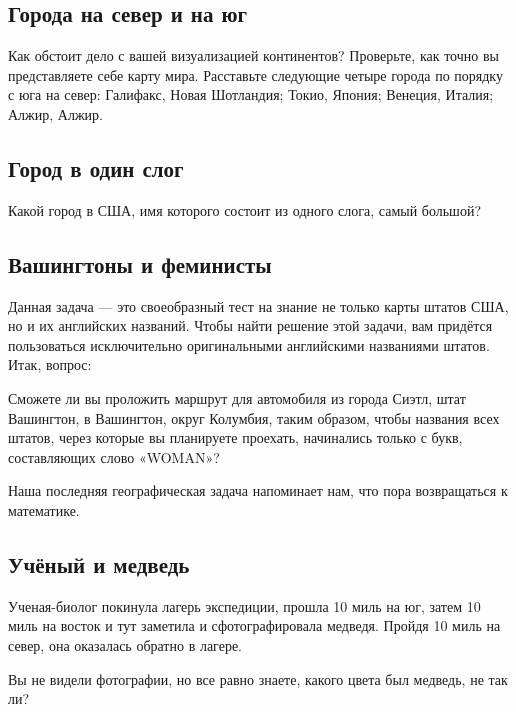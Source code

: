 \subsection*{Города на север и на юг}%


Как обстоит дело с вашей визуализацией континентов?
Проверьте, как точно вы представляете себе %
карту мира.
Расставьте следующие  четыре города по порядку с юга на север: 
Галифакс, Новая Шотландия; %
Токио, Япония; %
Венеция, Италия; %
Алжир, Алжир. %


\subsection*{Город в один слог}%


Какой город в США, имя которого состоит из одного слога,  самый большой?


\subsection*{Вашингтоны и феминисты}%


Данная задача --- это своеобразный тест на знание не только карты штатов США, но и их английских названий.  
Чтобы найти решение этой задачи, вам придётся пользоваться исключительно оригинальными английскими названиями штатов.  
Итак, вопрос:


Сможете ли вы проложить маршрут для автомобиля из города Сиэтл, штат Вашингтон, 
 в Вашингтон, округ Колумбия, таким образом, чтобы названия всех штатов, через которые вы планируете проехать, начинались только с букв, составляющих слово  «WOMAN»?


\medskip

Наша последняя географическая задача  напоминает нам, что пора возвращаться к математике.  %


\subsection*{Учёный и медведь}%


Ученая-биолог покинула лагерь экспедиции, прошла 10 миль на юг, затем 10 миль на восток и тут заметила и сфотографировала медведя.  Пройдя 10 миль на север, она оказалась обратно в лагере. 

\medskip

Вы не видели фотографии, но все равно знаете, какого цвета был медведь, не так ли?